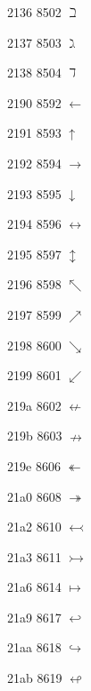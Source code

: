 \documentclass[11pt]{article}
\begin{document}
2136 8502 \ensuremath{\beth}

2137 8503 \ensuremath{\gimel}

2138 8504 \ensuremath{\daleth}




%
%
%
%
%
%
%
%
%
%
%

2190 8592 \ensuremath{\leftarrow}

2191 8593 \ensuremath{\uparrow}

2192 8594 \ensuremath{\rightarrow}

2193 8595 \ensuremath{\downarrow}

2194 8596 \ensuremath{\leftrightarrow}

2195 8597 \ensuremath{\updownarrow}

2196 8598 \ensuremath{\nwarrow}

2197 8599 \ensuremath{\nearrow}

2198 8600 \ensuremath{\searrow}

2199 8601 \ensuremath{\swarrow}

219a 8602 \ensuremath{\nleftarrow}

219b 8603 \ensuremath{\nrightarrow}



219e 8606 \ensuremath{\twoheadleftarrow}

21a0 8608 \ensuremath{\twoheadrightarrow}

21a2 8610 \ensuremath{\leftarrowtail}

21a3 8611 \ensuremath{\rightarrowtail}

21a6 8614 \ensuremath{\mapsto}

21a9 8617 \ensuremath{\hookleftarrow}

21aa 8618 \ensuremath{\hookrightarrow}

21ab 8619 \ensuremath{\looparrowleft}
\end{document}
